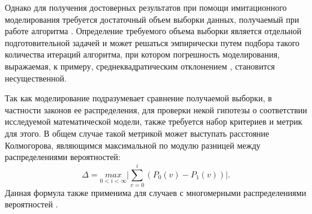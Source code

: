 Однако для получения достоверных результатов при помощи имитационного моделирования требуется достаточный объем выборки данных, получаемый при работе алгоритма \cite{лобач2004имитационное,моисеев2016исследование}. Определение требуемого объема выборки является отдельной подготовительной задачей и может решаться эмпирически путем подбора такого количества итераций алгоритма, при котором погрешность моделирования, выражаемая, к примеру, среднеквадратическим отклонением \cite{алиев2013погрешности}, становится несущественной.

Так как моделирование подразумевает сравнение получаемой выборки, в частности законов ее распределения, для проверки некой гипотезы о соответствии исследуемой математической модели, также требуется набор критериев и метрик для этого. В общем случае такой метрикой может выступать расстояние Колмогорова, являющимся максимальной по модулю разницей между распределениями вероятностей:
\begin{equation}\label{kdistance}
	\Delta = \underset{0 < i < \infty}{max}\bigg\rvert \sum_{v=0}^{i} (P_0(v) - P_1(v))\bigg\rvert.
\end{equation}
Данная формула также применима для случаев с многомерными распределениями вероятностей \cite{fasano1987multidimensional}.